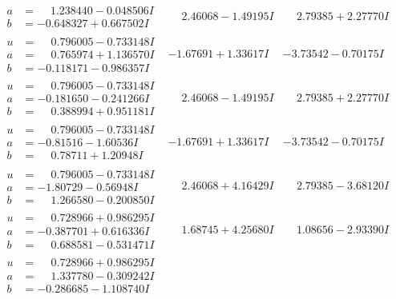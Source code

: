 \documentclass[1p]{elsarticle_modified}
\theoremstyle{definition}
\begin{document}
$$\begin{array}{c|c|c}
\begin{aligned}
a &= \phantom{-}1.238440 - 0.048506 I \\
b &= -0.648327 + 0.667502 I\end{aligned}
 & \phantom{-}2.46068 - 1.49195 I & \phantom{-}2.79385 + 2.27770 I \\ \hline\begin{aligned}
u &= \phantom{-}0.796005 - 0.733148 I \\
a &= \phantom{-}0.765974 + 1.136570 I \\
b &= -0.118171 - 0.986357 I\end{aligned}
 & -1.67691 + 1.33617 I & -3.73542 - 0.70175 I \\ \hline\begin{aligned}
u &= \phantom{-}0.796005 - 0.733148 I \\
a &= -0.181650 - 0.241266 I \\
b &= \phantom{-}0.388994 + 0.951181 I\end{aligned}
 & \phantom{-}2.46068 - 1.49195 I & \phantom{-}2.79385 + 2.27770 I \\ \hline\begin{aligned}
u &= \phantom{-}0.796005 - 0.733148 I \\
a &= -0.81516 - 1.60536 I \\
b &= \phantom{-}0.78711 + 1.20948 I\end{aligned}
 & -1.67691 + 1.33617 I & -3.73542 - 0.70175 I \\ \hline\begin{aligned}
u &= \phantom{-}0.796005 - 0.733148 I \\
a &= -1.80729 - 0.56948 I \\
b &= \phantom{-}1.266580 - 0.200850 I\end{aligned}
 & \phantom{-}2.46068 + 4.16429 I & \phantom{-}2.79385 - 3.68120 I \\ \hline\begin{aligned}
u &= \phantom{-}0.728966 + 0.986295 I \\
a &= -0.387701 + 0.616336 I \\
b &= \phantom{-}0.688581 - 0.531471 I\end{aligned}
 & \phantom{-}1.68745 + 4.25680 I & \phantom{-}1.08656 - 2.93390 I \\ \hline\begin{aligned}
u &= \phantom{-}0.728966 + 0.986295 I \\
a &= \phantom{-}1.337780 - 0.309242 I \\
b &= -0.286685 - 1.108740 I\end{aligned}

\end{array}$$
\end{document}
